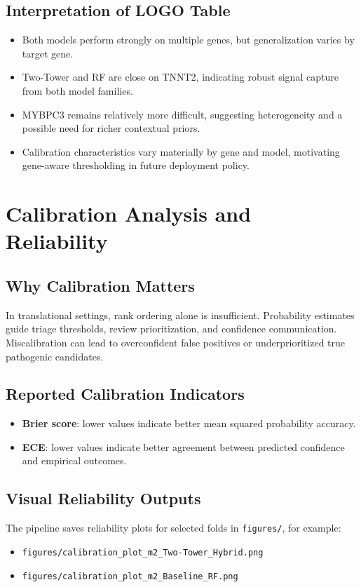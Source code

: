 \documentclass[11pt,a4paper]{article}
\begin{document}
\subsection{Interpretation of LOGO Table}
\begin{itemize}[leftmargin=1.2cm]
    \item Both models perform strongly on multiple genes, but generalization varies by target gene.
    \item Two-Tower and RF are close on TNNT2, indicating robust signal capture from both model families.
    \item MYBPC3 remains relatively more difficult, suggesting heterogeneity and a possible need for richer contextual priors.
    \item Calibration characteristics vary materially by gene and model, motivating gene-aware thresholding in future deployment policy.
\end{itemize}

\section{Calibration Analysis and Reliability}
\subsection{Why Calibration Matters}
In translational settings, rank ordering alone is insufficient. Probability estimates guide triage thresholds, review prioritization, and confidence communication. Miscalibration can lead to overconfident false positives or underprioritized true pathogenic candidates.

\subsection{Reported Calibration Indicators}
\begin{itemize}[leftmargin=1.2cm]
    \item \textbf{Brier score}: lower values indicate better mean squared probability accuracy.
    \item \textbf{ECE}: lower values indicate better agreement between predicted confidence and empirical outcomes.
\end{itemize}

\subsection{Visual Reliability Outputs}
The pipeline saves reliability plots for selected folds in \texttt{figures/}, for example:
\begin{itemize}[leftmargin=1.2cm]
    \item \texttt{figures/calibration\_plot\_m2\_Two-Tower\_Hybrid.png}
    \item \texttt{figures/calibration\_plot\_m2\_Baseline\_RF.png}
\end{itemize}
\end{document}

